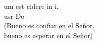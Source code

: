 \begin{cancion}%
	um est cidere in i,\\
	usr Do\\
(Bueno es confiar en el Señor,\\
 bueno es esperar en el Señor)\\
\end{cancion}%
